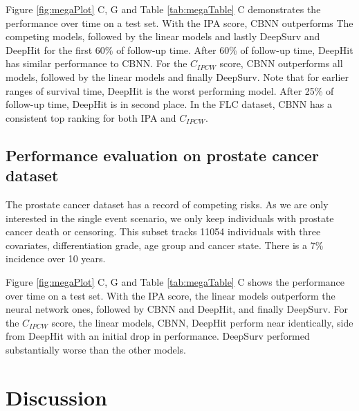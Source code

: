 \documentclass[APA,LATO1COL]{WileyNJD-v2}
\begin{document}
Figure \ref{fig:megaPlot} C, G and Table \ref{tab:megaTable} C
demonstrates the performance over time on a test set. With the IPA score, CBNN outperforms
The competing models, followed by the linear models and lastly DeepSurv and DeepHit for the first 60\% of follow-up time. 
After 60\% of follow-up time, DeepHit has similar performance to CBNN. For the \(C_{IPCW}\) score, CBNN outperforms all models,
followed by the linear models and finally DeepSurv. Note that for earlier ranges of survival time, DeepHit is the worst performing model. 
After 25\% of follow-up time, DeepHit is in second place. In the FLC dataset, CBNN has a consistent top ranking for both IPA and  \(C_{IPCW}\).

\hypertarget{pe-prostate}{%
\subsection{Performance evaluation on prostate cancer dataset}\label{pe-prostate}}
The prostate cancer dataset has a record of competing risks\citep{prostate}. As we are only interested in the
single event scenario, we only keep individuals with prostate cancer death or censoring\citep{prostate}.
This subset tracks 11054 individuals with three covariates, differentiation grade, age group and cancer state\citep{prostate}.
There is a 7\% incidence over 10 years.

Figure \ref{fig:megaPlot} C, G and Table \ref{tab:megaTable} C shows the
performance over time on a test set. With the IPA score, the linear models
outperform the neural network ones, followed by CBNN and DeepHit, and
finally DeepSurv. For the \(C_{IPCW}\) score, the linear models, CBNN, DeepHit
perform near identically, side from DeepHit with an initial drop in performance.
DeepSurv performed substantially worse than the other models.



\hypertarget{discussion}{%
\section{Discussion}\label{discussion}}
\end{document}
